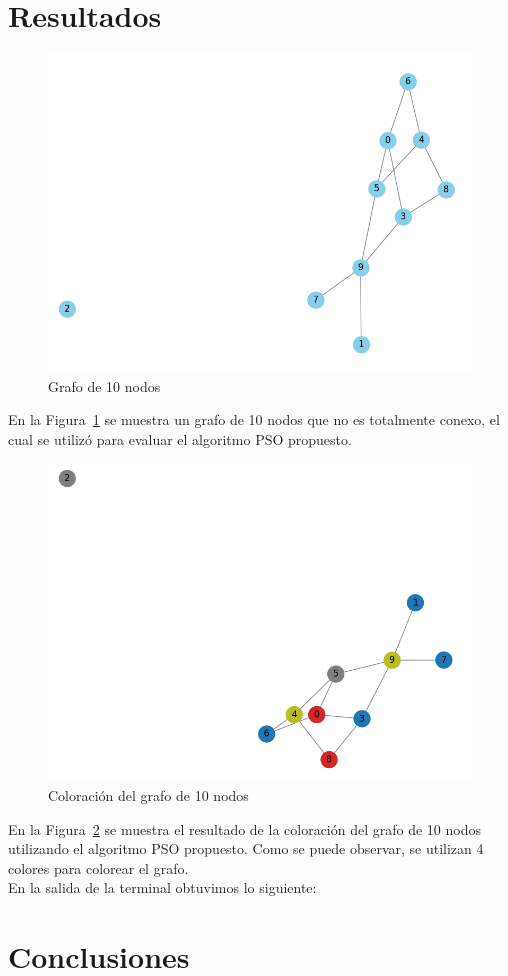 \documentclass[9pt,a4paper,twoside]{tau-class/tau}
\begin{document}
\section{Resultados}
    \begin{figure}[H]
        \centering
        \includegraphics[width=0.5\columnwidth]{MCGP/graph.png}
        \caption{Grafo de 10 nodos}
        \label{fig:graph}
    \end{figure}
    En la Figura~\ref*{fig:graph} se muestra un grafo de 10 nodos que no es totalmente conexo, el cual 
    se utilizó para evaluar el algoritmo PSO propuesto.
    \begin{figure}[H]
        \centering
        \includegraphics[width=0.5\columnwidth]{MCGP/graphColored.png}
        \caption{Coloración del grafo de 10 nodos}
        \label{fig:graphColored}
    \end{figure}
    En la Figura~\ref*{fig:graphColored} se muestra el resultado de la coloración del grafo de 10 nodos utilizando el algoritmo PSO propuesto.
    Como se puede observar, se utilizan 4 colores para colorear el grafo. \\ 
    En la salida de la terminal obtuvimos lo siguiente:
    

\section{Conclusiones}


\printbibliography
\end{document}
